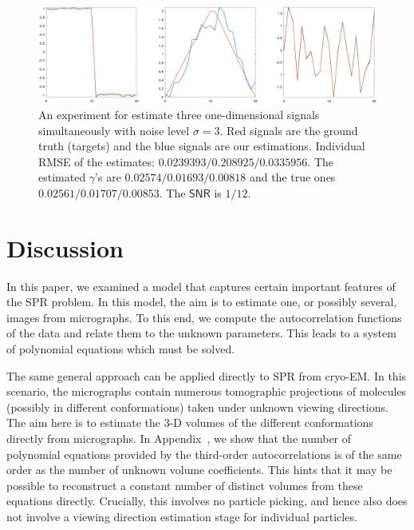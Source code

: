 \documentclass[english,11pt]{article}
\newcommand{\1}{\mathbf{1}}
\newcommand{\TODO}[1]{{\color{red}{[#1]}}}
\numberwithin{equation}{section}
\theoremstyle{plain}
\theoremstyle{definition}
\theoremstyle{remark}
\theoremstyle{plain}
\theoremstyle{remark}
\theoremstyle{plain}
\theoremstyle{plain}
\newcommand{\SNR}{\ensuremath{\textsf{SNR}}}
\begin{document}
\begin{figure}[t]
	\centering
	\includegraphics[width=\linewidth]{XP_1D_heterogeneous/hetero_example}
	\caption{An experiment for estimate three one-dimensional signals simultaneously with noise level $\sigma=3$. Red signals are the ground truth (targets) and the blue signals are our estimations. Individual RMSE of the estimates: $0.0239393 / 0.208925 / 0.0335956$. The estimated $\gamma$'s are $0.02574 / 0.01693 / 0.00818$ and the true ones $0.02561 / 0.01707 / 0.00853$. The $\SNR$ is $1/12$. \TODO{1. to replace with a ``progress'' plot 2. replace the triangle signal 3. add error progress figure}}
	\label{fig:1Dheterosignals}
\end{figure}



\section{Discussion}


In this paper, we examined a model that captures certain important features of the SPR problem. In this model, the aim is to estimate one, or possibly several, images from micrographs. To this end, we compute the autocorrelation functions of the data and relate them to the unknown parameters. This leads to a system of polynomial equations which must be solved.

The same general approach can be applied directly to SPR from cryo-EM. In this scenario, the micrographs contain numerous tomographic projections of molecules (possibly in different conformations) taken under unknown viewing directions. The aim here is to estimate the 3-D volumes of the different conformations directly from micrographs. In Appendix~\TODO{ref}, we show that the number of polynomial equations provided by the third-order autocorrelations is of the same order as the number of unknown volume coefficients. This hints that it may be possible to reconstruct a constant number of distinct volumes from these equations directly. Crucially, this involves no particle picking, and hence also does not involve a viewing direction estimation stage for individual particles. \TODO{Where and how do we cite Kam? Fred?}
\end{document}
